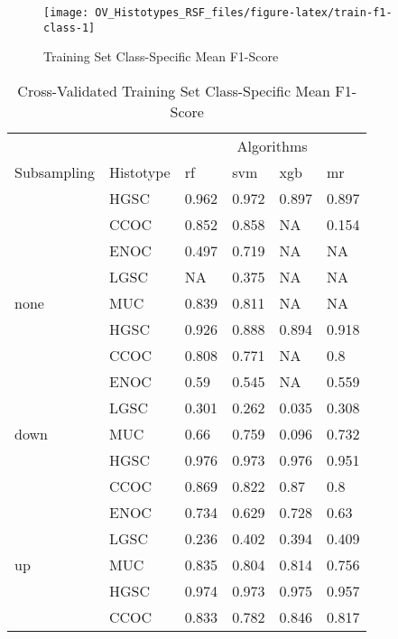 \documentclass[
]{report}
\begin{document}
\begin{figure}[H]

{\centering \texttt{[image: OV\_Histotypes\_RSF\_files/figure-latex/train-f1-class-1]} 

}

\caption{Training Set Class-Specific Mean F1-Score}\label{fig:train-f1-class}
\end{figure}

\begin{table}

\caption{\label{tab:train-f1-class-table}Cross-Validated Training Set Class-Specific Mean F1-Score}
\centering
\begin{tabular}[t]{l|l|l|l|l|l}
\hline
\multicolumn{2}{c|}{ } & \multicolumn{4}{c}{Algorithms} \\
\cline{3-6}
Subsampling & Histotype & rf & svm & xgb & mr\\
\hline
 & HGSC & 0.962 & 0.972 & 0.897 & 0.897\\
\cline{2-6}
 & CCOC & 0.852 & 0.858 & NA & 0.154\\
\cline{2-6}
 & ENOC & 0.497 & 0.719 & NA & NA\\
\cline{2-6}
 & LGSC & NA & 0.375 & NA & NA\\
\cline{2-6}
\multirow{-5}{*}{\raggedright\arraybackslash none} & MUC & 0.839 & 0.811 & NA & NA\\
\cline{1-6}
 & HGSC & 0.926 & 0.888 & 0.894 & 0.918\\
\cline{2-6}
 & CCOC & 0.808 & 0.771 & NA & 0.8\\
\cline{2-6}
 & ENOC & 0.59 & 0.545 & NA & 0.559\\
\cline{2-6}
 & LGSC & 0.301 & 0.262 & 0.035 & 0.308\\
\cline{2-6}
\multirow{-5}{*}{\raggedright\arraybackslash down} & MUC & 0.66 & 0.759 & 0.096 & 0.732\\
\cline{1-6}
 & HGSC & 0.976 & 0.973 & 0.976 & 0.951\\
\cline{2-6}
 & CCOC & 0.869 & 0.822 & 0.87 & 0.8\\
\cline{2-6}
 & ENOC & 0.734 & 0.629 & 0.728 & 0.63\\
\cline{2-6}
 & LGSC & 0.236 & 0.402 & 0.394 & 0.409\\
\cline{2-6}
\multirow{-5}{*}{\raggedright\arraybackslash up} & MUC & 0.835 & 0.804 & 0.814 & 0.756\\
\cline{1-6}
 & HGSC & 0.974 & 0.973 & 0.975 & 0.957\\
\cline{2-6}
 & CCOC & 0.833 & 0.782 & 0.846 & 0.817\\

\end{tabular}
\end{table}
\end{document}
